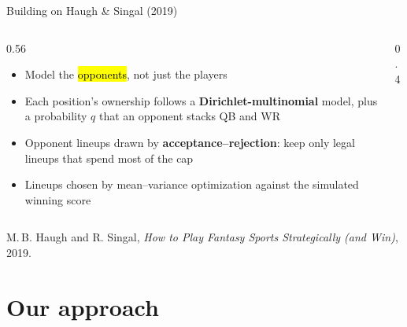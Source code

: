\begin{frame}{Building on Haugh \& Singal (2019)}
  \begin{columns}[c]
    \begin{column}{0.56\textwidth}
      \begin{itemize}
        \setlength\itemsep{0.6em}
        \item Model the \hl{opponents}, not just the players
        \item Each position's ownership follows a \textbf{Dirichlet-multinomial} model,
          plus a probability $q$ that an opponent stacks QB and WR
        \item Opponent lineups drawn by \textbf{acceptance--rejection}: keep only legal
          lineups that spend most of the cap
        \item Lineups chosen by mean--variance optimization against the simulated
          winning score
      \end{itemize}
    \end{column}
    \begin{column}{0.4\textwidth}
      \vspace{1.2em}

    \end{column}
  \end{columns}
  \vfill
  {\scriptsize M.\,B. Haugh and R. Singal, \emph{How to Play Fantasy Sports Strategically
  (and Win)}, 2019.\par}
\end{frame}

\section{Our approach}

